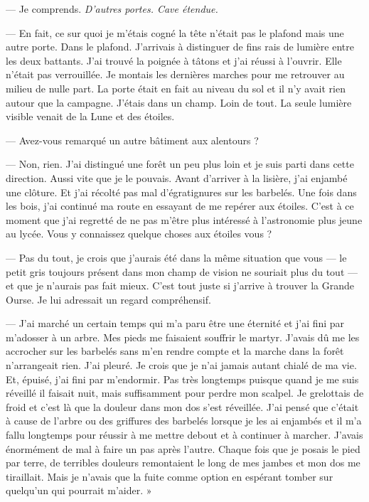 — Je comprends. \emph{D'autres portes. Cave étendue.}

— En fait, ce sur quoi je m'étais cogné la tête n'était pas le plafond mais une autre porte. Dans le plafond. J'arrivais
à distinguer de fins rais de lumière entre les deux battants. J'ai trouvé la poignée à tâtons et j'ai réussi à l'ouvrir.
Elle n'était pas verrouillée. Je montais les dernières marches pour me retrouver au milieu de nulle part. La porte 
était en fait au niveau du sol et il n'y avait rien autour que la campagne. J'étais dans un champ. Loin de tout. La 
seule lumière visible venait de la Lune et des étoiles.

— Avez-vous remarqué un autre bâtiment aux alentours ?

— Non, rien. J'ai distingué une forêt un peu plus loin et je suis parti dans cette direction. Aussi vite que je le
pouvais. Avant d'arriver à la lisière, j'ai enjambé une clôture. Et j'ai récolté pas mal d'égratignures sur les
barbelés. Une fois dans les bois, j'ai continué ma route en essayant de me repérer aux étoiles. C'est à ce moment que
j'ai regretté de ne pas m'être plus intéressé à l'astronomie plus jeune au lycée. Vous y connaissez quelque choses aux
étoiles vous ?

— Pas du tout, je crois que j'aurais été dans la même situation que vous — le petit gris toujours présent dans mon 
champ de vision ne souriait plus du tout — et que je n'aurais pas fait mieux. C'est tout juste si j'arrive à trouver la 
Grande Ourse. Je lui adressait un regard compréhensif.

— J'ai marché un certain temps qui m'a paru être une éternité et j'ai fini par m'adosser à un arbre. Mes pieds me
faisaient souffrir le martyr. J'avais dû me les accrocher sur les barbelés sans m'en rendre compte et la marche dans la
forêt n'arrangeait rien. J'ai pleuré. Je crois que je n'ai jamais autant chialé de ma vie. Et, épuisé, j'ai fini par
m'endormir. Pas très longtemps puisque quand je me suis réveillé il faisait nuit, mais suffisamment pour perdre mon
scalpel. Je grelottais de froid et c'est là que la douleur dans mon dos s'est réveillée. J'ai pensé que c'était à 
cause de l'arbre ou des griffures des barbelés lorsque je les ai enjambés et il m'a fallu longtemps pour réussir à me 
mettre debout et à continuer à marcher.
J'avais énormément de mal à faire un pas après l'autre. Chaque fois que je posais le pied par terre, de terribles
douleurs remontaient le long de mes jambes et mon dos me tiraillait. Mais je n'avais que la fuite comme option en 
espérant tomber sur quelqu'un qui pourrait m'aider. »

